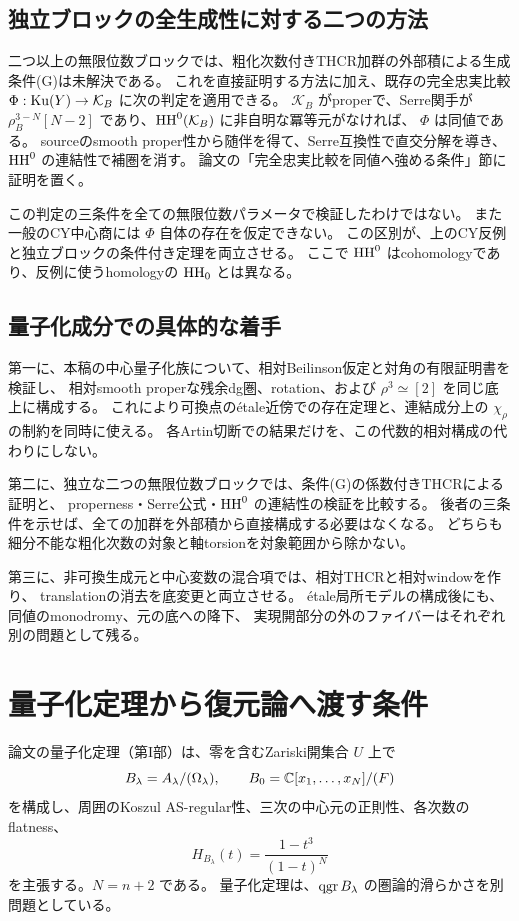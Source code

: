 \subsection{独立ブロックの全生成性に対する二つの方法}

二つ以上の無限位数ブロックでは、粗化次数付きTHCR加群の外部積による生成条件(G)は未解決である。
これを直接証明する方法に加え、既存の完全忠実比較
\(\Phi:\operatorname{Ku}(Y)\to\mathcal K_B\) に次の判定を適用できる。
\(\mathcal K_B\) がproperで、Serre関手が
\(\rho_B^{3-N}[N-2]\) であり、\(\operatorname{HH}^0(\mathcal K_B)\) に非自明な冪等元がなければ、
\(\Phi\) は同値である。
sourceのsmooth proper性から随伴を得て、Serre互換性で直交分解を導き、
\(\operatorname{HH}^0\) の連結性で補圏を消す。
論文の「完全忠実比較を同値へ強める条件」節に証明を置く。

この判定の三条件を全ての無限位数パラメータで検証したわけではない。
また一般のCY中心商には \(\Phi\) 自体の存在を仮定できない。
この区別が、上のCY反例と独立ブロックの条件付き定理を両立させる。
ここで \(\operatorname{HH}^0\) はcohomologyであり、反例に使うhomologyの \(\operatorname{HH}_0\) とは異なる。

\subsection{量子化成分での具体的な着手}

第一に、本稿の中心量子化族について、相対Beilinson仮定と対角の有限証明書を検証し、
相対smooth properな残余dg圏、rotation、および \(\rho^3\simeq[2]\) を同じ底上に構成する。
これにより可換点のétale近傍での存在定理と、連結成分上の \(\chi_\rho\) の制約を同時に使える。
各Artin切断での結果だけを、この代数的相対構成の代わりにしない。

第二に、独立な二つの無限位数ブロックでは、条件(G)の係数付きTHCRによる証明と、
properness・Serre公式・\(\operatorname{HH}^0\) の連結性の検証を比較する。
後者の三条件を示せば、全ての加群を外部積から直接構成する必要はなくなる。
どちらも細分不能な粗化次数の対象と軸torsionを対象範囲から除かない。

第三に、非可換生成元と中心変数の混合項では、相対THCRと相対windowを作り、
translationの消去を底変更と両立させる。
étale局所モデルの構成後にも、同値のmonodromy、元の底への降下、
実現開部分の外のファイバーはそれぞれ別の問題として残る。

\section{量子化定理から復元論へ渡す条件}

論文の量子化定理（第I部）は、零を含むZariski開集合 \(U\) 上で
\[
 B_\lambda=A_\lambda/(\Omega_\lambda),\qquad
 B_0=\mathbb C[x_1,\ldots,x_N]/(F)
\]
を構成し、周囲のKoszul AS-regular性、三次の中心元の正則性、各次数のflatness、
\[
 H_{B_\lambda}(t)=\frac{1-t^3}{(1-t)^N}
\]
を主張する。\(N=n+2\) である。
量子化定理は、\(\operatorname{qgr} B_\lambda\) の圏論的滑らかさを別問題としている。

